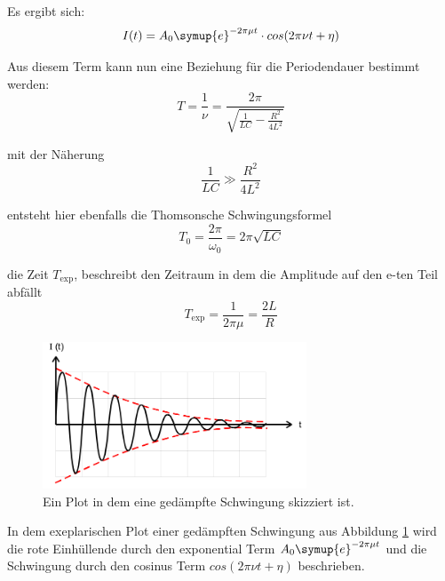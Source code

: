         \noindent Es ergibt sich:
        \begin{equation}
            I(t) = A_0 \symup{e}^{- 2 \pi \mu t} \cdot cos(2\pi \nu t + \eta) \nonumber
        \end{equation}

        \noindent Aus diesem Term kann nun eine Beziehung für die Periodendauer bestimmt werden:
        \begin{equation}
            T = \frac{1}{\nu} = \frac{2 \pi}{\sqrt{\frac{1}{LC}-\frac{R^2}{4L^2}}} \nonumber
        \end{equation}

        \noindent mit der Näherung
        \begin{equation}
            \frac{1}{LC} \gg \frac{R^2}{4L^2} \nonumber
        \end{equation}

        \noindent entsteht hier ebenfalls die Thomsonsche Schwingungsformel
        \begin{equation}
            T_0 = \frac{2\pi}{\omega_0} = 2\pi \sqrt{LC} \nonumber
        \end{equation}

        \noindent die Zeit $T_{\text{exp}}$, beschreibt den Zeitraum in dem die Amplitude auf den e-ten Teil abfällt
        \begin{equation}
            T_{\text{exp}} = \frac{1}{2 \pi \mu } = \frac{2L}{R} \nonumber
        \end{equation}

        \begin{figure}[H]
            \centering
            \includegraphics[width=0.7\textwidth]{images/ged.PNG}
            \caption{Ein Plot in dem eine gedämpfte Schwingung skizziert ist.}
            \label{img:gedSch}
        \end{figure}

        \noindent In dem exeplarischen Plot einer gedämpften Schwingung aus Abbildung \ref{img:gedSch} wird die rote Einhüllende durch den 
        exponential Term $A_0 \symup{e}^{- 2 \pi \mu t}$ und die Schwingung durch den cosinus Term $cos(2\pi \nu t + \eta)$ beschrieben.


